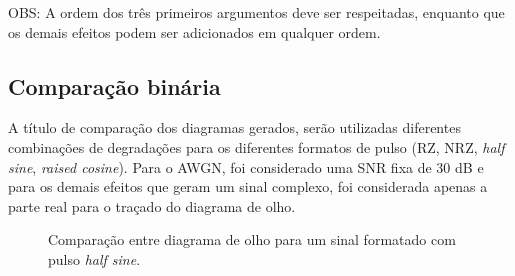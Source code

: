OBS: A ordem dos três primeiros argumentos deve ser respeitadas, enquanto que os demais efeitos podem ser adicionados em qualquer ordem.

\subsection*{Comparação binária}

A título de comparação dos diagramas gerados, serão utilizadas diferentes combinações de degradações para os diferentes formatos de pulso (RZ, NRZ, \textit{half sine}, \textit{raised cosine}). Para o AWGN, foi considerado uma SNR fixa de 30 dB e para os demais efeitos que geram um sinal complexo, foi considerada apenas a parte real para o traçado do diagrama de olho.

\begin{figure}[H]
\begin{center}
\end{center}
\caption{Comparação entre diagrama de olho para um sinal formatado com pulso \textit{half sine}.}
\label{fig:1} 
\end{figure}

